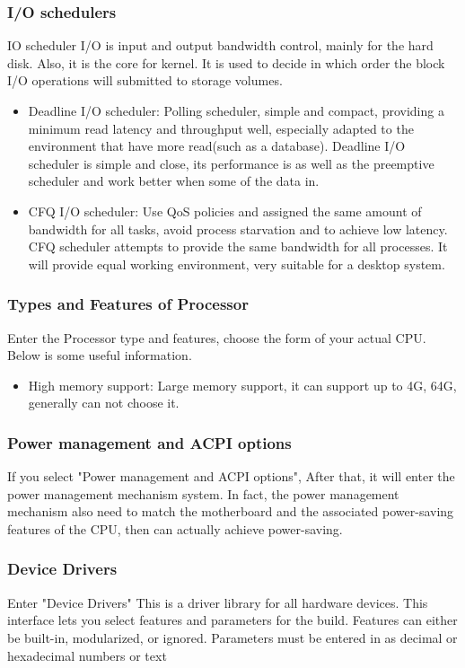 \documentclass[10pt,draftclsnofoot,peerreview ,letterpaper,onecolumn,]{IEEEtran}
\begin{document}
	\subsubsection{I/O schedulers}
	IO scheduler I/O is input and output bandwidth control, mainly for the hard disk. Also, it is the core for kernel. It is used to decide in which order the block I/O operations will submitted to storage volumes.
	\begin{itemize}
		\item Deadline I/O scheduler: Polling scheduler, simple and compact, providing a minimum read latency and throughput well, especially adapted to the environment that have more read(such as a database). Deadline I/O scheduler is simple and close, its performance is as well as the preemptive scheduler and work better when some of the data in. \\
		\item CFQ I/O scheduler: Use QoS policies and assigned the same amount of bandwidth for all tasks, avoid process starvation and to achieve low latency. CFQ scheduler attempts to provide the same bandwidth for all processes. It will provide equal working environment, very suitable for a desktop system. \\
	\end{itemize}
	
	\subsubsection{Types and Features of Processor}
	Enter the Processor type and features, choose the form of your actual CPU. Below is some useful information.\\
	\begin{itemize}
		\item High memory support: Large memory support, it can support up to 4G, 64G, generally can not choose it.
	\end{itemize}
	\subsubsection{Power management and ACPI options} 
	If you select "Power management and ACPI options", After that, it will enter the power management mechanism system. In fact, the power management mechanism also need to match the motherboard and the associated power-saving features of the CPU, then can actually achieve power-saving.\\
	
	\subsubsection{Device Drivers} 
	Enter "Device Drivers" This is a driver library for all hardware devices. This interface lets you select features and parameters for the build. Features can either be built-in, modularized, or ignored. Parameters must be entered in as decimal or hexadecimal numbers or text\\
	
\end{document}
